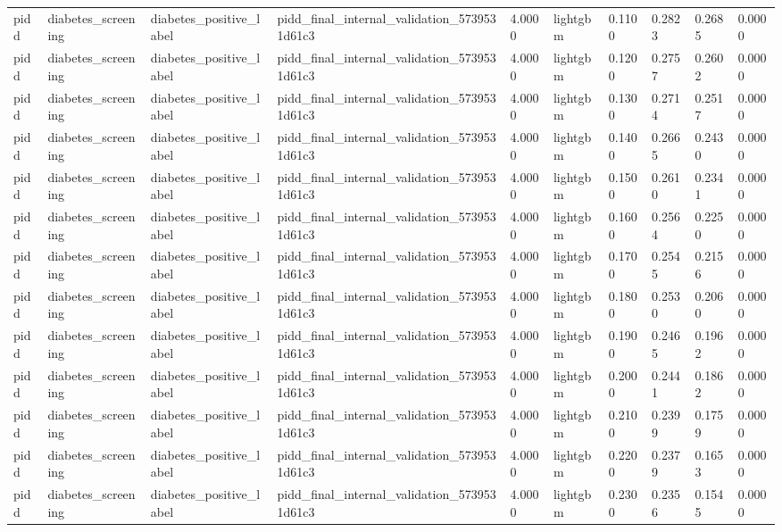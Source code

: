 \begin{tabular}{llllllllll}
pidd & diabetes\_screening & diabetes\_positive\_label & pidd\_final\_internal\_validation\_5739531d61c3 & 4.0000 & lightgbm & 0.1100 & 0.2823 & 0.2685 & 0.0000 \\
pidd & diabetes\_screening & diabetes\_positive\_label & pidd\_final\_internal\_validation\_5739531d61c3 & 4.0000 & lightgbm & 0.1200 & 0.2757 & 0.2602 & 0.0000 \\
pidd & diabetes\_screening & diabetes\_positive\_label & pidd\_final\_internal\_validation\_5739531d61c3 & 4.0000 & lightgbm & 0.1300 & 0.2714 & 0.2517 & 0.0000 \\
pidd & diabetes\_screening & diabetes\_positive\_label & pidd\_final\_internal\_validation\_5739531d61c3 & 4.0000 & lightgbm & 0.1400 & 0.2665 & 0.2430 & 0.0000 \\
pidd & diabetes\_screening & diabetes\_positive\_label & pidd\_final\_internal\_validation\_5739531d61c3 & 4.0000 & lightgbm & 0.1500 & 0.2610 & 0.2341 & 0.0000 \\
pidd & diabetes\_screening & diabetes\_positive\_label & pidd\_final\_internal\_validation\_5739531d61c3 & 4.0000 & lightgbm & 0.1600 & 0.2564 & 0.2250 & 0.0000 \\
pidd & diabetes\_screening & diabetes\_positive\_label & pidd\_final\_internal\_validation\_5739531d61c3 & 4.0000 & lightgbm & 0.1700 & 0.2545 & 0.2156 & 0.0000 \\
pidd & diabetes\_screening & diabetes\_positive\_label & pidd\_final\_internal\_validation\_5739531d61c3 & 4.0000 & lightgbm & 0.1800 & 0.2530 & 0.2060 & 0.0000 \\
pidd & diabetes\_screening & diabetes\_positive\_label & pidd\_final\_internal\_validation\_5739531d61c3 & 4.0000 & lightgbm & 0.1900 & 0.2465 & 0.1962 & 0.0000 \\
pidd & diabetes\_screening & diabetes\_positive\_label & pidd\_final\_internal\_validation\_5739531d61c3 & 4.0000 & lightgbm & 0.2000 & 0.2441 & 0.1862 & 0.0000 \\
pidd & diabetes\_screening & diabetes\_positive\_label & pidd\_final\_internal\_validation\_5739531d61c3 & 4.0000 & lightgbm & 0.2100 & 0.2399 & 0.1759 & 0.0000 \\
pidd & diabetes\_screening & diabetes\_positive\_label & pidd\_final\_internal\_validation\_5739531d61c3 & 4.0000 & lightgbm & 0.2200 & 0.2379 & 0.1653 & 0.0000 \\
pidd & diabetes\_screening & diabetes\_positive\_label & pidd\_final\_internal\_validation\_5739531d61c3 & 4.0000 & lightgbm & 0.2300 & 0.2356 & 0.1545 & 0.0000 \\

\end{tabular}
